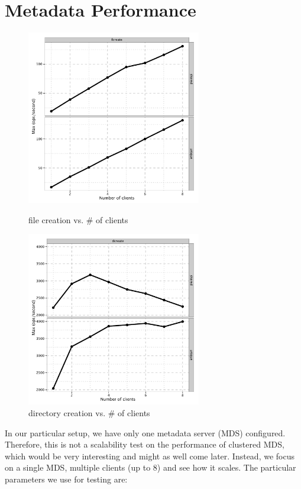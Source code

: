 \documentclass{article}
\begin{document}
\section{Metadata Performance}

\begin{figure}[htb]
\centering
\begin{minipage}[t]{0.5\linewidth}
\centering
\includegraphics[width=3in]{data/mdtest-fcreate}
\caption{file creation vs.  \# of clients}
\label{fig:mdtest-fcreate}
\end{minipage}%
\begin{minipage}[t]{0.5\linewidth}
\centering
\includegraphics[width=3in]{data/mdtest-dcreate}
\caption{directory creation vs. \# of clients}
\label{fig:mdtest-dcreate}
\end{minipage}%
\end{figure}


In our particular setup, we have only one metadata server (MDS)
configured. Therefore, this is not a scalability test on the performance of
clustered MDS, which would be very interesting and might as well come later.
Instead, we focus on a single MDS, multiple clients (up to 8) and see how it
scales. The particular parameters we use for testing are:
\end{document}
